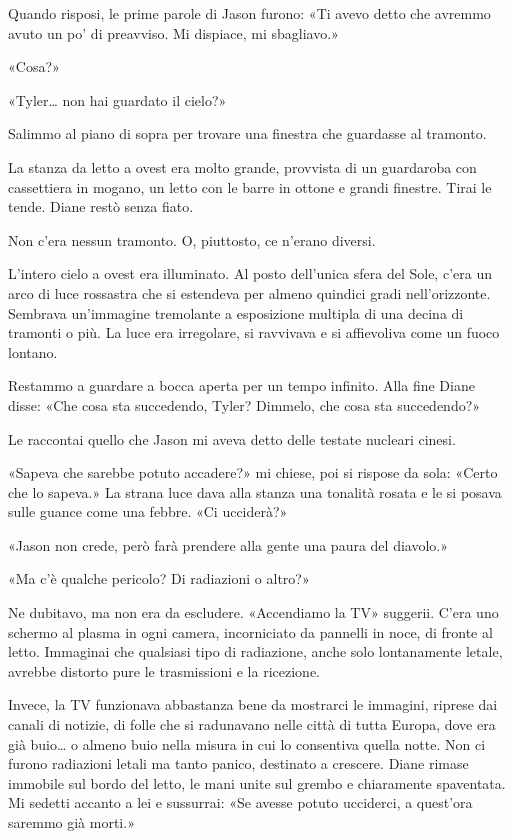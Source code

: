 Quando risposi, le prime parole di Jason furono: «Ti avevo detto che
avremmo avuto un po' di preavviso. Mi dispiace, mi sbagliavo.»

«Cosa?»

«Tyler\ldots{} non hai guardato il cielo?»

\separatorefiori

Salimmo al piano di sopra per trovare una finestra che guardasse al
tramonto.

La stanza da letto a ovest era molto grande, provvista di un guardaroba
con cassettiera in mogano, un letto con le barre in ottone e grandi
finestre. Tirai le tende. Diane restò senza fiato.

Non c'era nessun tramonto. O, piuttosto, ce n'erano diversi.

L'intero cielo a ovest era illuminato. Al posto dell'unica sfera del
Sole, c'era un arco di luce rossastra che si estendeva per almeno
quindici gradi nell'orizzonte. Sembrava un'immagine tremolante a
esposizione multipla di una decina di tramonti o più. La luce era
irregolare, si ravvivava e si affievoliva come un fuoco lontano.

Restammo a guardare a bocca aperta per un tempo infinito. Alla fine
Diane disse: «Che cosa sta succedendo, Tyler? Dimmelo, che cosa sta
succedendo?»

Le raccontai quello che Jason mi aveva detto delle testate nucleari
cinesi.

«Sapeva che sarebbe potuto accadere?» mi chiese, poi si rispose da sola:
«Certo che lo sapeva.» La strana luce dava alla stanza una tonalità
rosata e le si posava sulle guance come una febbre. «Ci ucciderà?»

«Jason non crede, però farà prendere alla gente una paura del diavolo.»

«Ma c'è qualche pericolo? Di radiazioni o altro?»

Ne dubitavo, ma non era da escludere. «Accendiamo la TV» suggerii. C'era
uno schermo al plasma in ogni camera, incorniciato da pannelli in noce,
di fronte al letto. Immaginai che qualsiasi tipo di radiazione, anche
solo lontanamente letale, avrebbe distorto pure le trasmissioni e la
ricezione.

Invece, la TV funzionava abbastanza bene da mostrarci le immagini,
riprese dai canali di notizie, di folle che si radunavano nelle città di
tutta Europa, dove era già buio\ldots{} o almeno buio nella misura in
cui lo consentiva quella notte. Non ci furono radiazioni letali ma tanto
panico, destinato a crescere. Diane rimase immobile sul bordo del letto,
le mani unite sul grembo e chiaramente spaventata. Mi sedetti accanto a
lei e sussurrai: «Se avesse potuto ucciderci, a quest'ora saremmo già
morti.»

